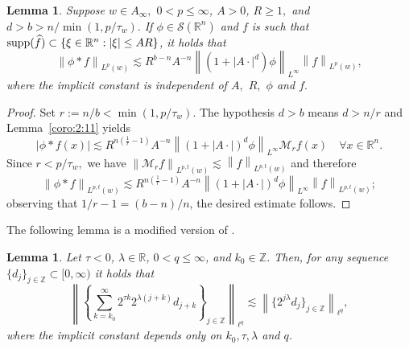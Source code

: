 \documentclass[10pt,a4paper]{article}
\newtheorem{lemma}[theorem]{Lemma}
\theoremstyle{remark}
\newcommand{\re}{\mathbb{R}}
\newcommand{\ent}{\mathbb{Z}}
\newcommand{\rn}{{{\mathbb R}^n}}
\newcommand{\sw}{{\mathcal{S}}(\rn)}
\newcommand{\lebw}[2]{L^{#1}(#2)} %
\newcommand{\M}{\mathcal{M}} %
\newcommand{\abs}[1]{\left\vert #1 \right\vert}
\newcommand{\norm}[2]{\left\|#1\right\|_{#2}}
\newcommand{\supp}{{\rm{supp}}}
\newcommand{\ex}{d}
\begin{document}
\begin{lemma}\label{coro:2:12(1)}
Suppose $w\in A_\infty,$ $0 < p \leq \infty$, $A > 0$, $R \geq 1,$  and $\ex > b > n/ \min(1,p/\tau_w).$  If $\phi \in \sw$ and $f$ is such that $\supp(\widehat{f}) \subset \{\xi\in\rn:\abs{\xi}\le AR\}$, it holds that
\begin{equation*}
\norm{\phi * f}{\lebw{p}{w}} \lesssim R^{b - n} A^{-n} \norm{(1 + |A \cdot|^\ex) \phi}{L^\infty} \norm{f}{\lebw{p}{w}},
\end{equation*}
where the implicit constant is independent of $A,$ $R,$ $\phi$ and $f.$ 
\end{lemma}

\begin{proof}  Set $r:=n/b < \min(1, p/\tau_w).$ The hypothesis $\ex > b$  means $ \ex  > n/r$ and Lemma~\ref{coro:2:11}  yields
$$
|\phi * f(x)| \lesssim R^{n (\frac{1}{r} -1)} A^{-n} \norm{(1 + |A \cdot|)^\ex \phi}{L^\infty}  \M_rf(x) \quad \forall x \in \rn.
$$
Since $r < p/\tau_w,$ we have   $\norm{\M_rf}{\lebw{p,t}{w}} \lesssim \norm{f}{\lebw{p,t}{w}}$ and therefore
$$
\norm{\phi * f}{\lebw{p,t}{w}} \lesssim R^{n (\frac{1}{r} -1)} A^{-n} \norm{(1 + |A \cdot|)^\ex \phi}{L^\infty} \norm{f}{\lebw{p,t}{w}};
$$
observing that $1/r -1 = (b -n)/n$, the desired estimate follows. 
\end{proof}

The following lemma is a modified version of \cite[Lemma 3.8]{MR837335}.
\begin{lemma}\label{eq:seriesineq} Let  $\tau < 0$, $\lambda \in \re$, $0 < q \leq \infty$, and $k_0 \in \ent$. Then, for any sequence $\{d_j\}_{j \in \ent} \subset [0, \infty)$ it holds that
\begin{equation*}
\norm{\left\{\sum_{k=k_0}^\infty 2^{\tau k} 2^{\lambda(j+k)}d_{j+k}\right\}_{j\in\ent}}{\ell^q} \lesssim \norm{\{2^{j \lambda} d_j\}_{j\in\ent}}{\ell^q},
\end{equation*}
where the implicit constant depends only on $k_0, \tau, \lambda$ and $q$.
\end{lemma}
\end{document}
